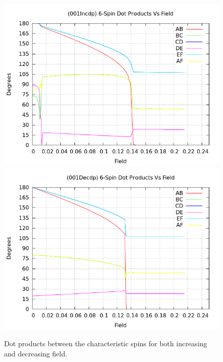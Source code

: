 \documentclass{article}
\begin{document}
\begin{center}
\begin{figure}
\centering
\includegraphics[scale=0.55]{HVariedData/Pictures/001Incdp.png}
\includegraphics[scale=0.55]{HVariedData/Pictures/001Decdp.png}
\caption{Dot products between the characteristic spins for both increasing and decreasing field.}
\end{figure}
\end{center}
\end{document}

